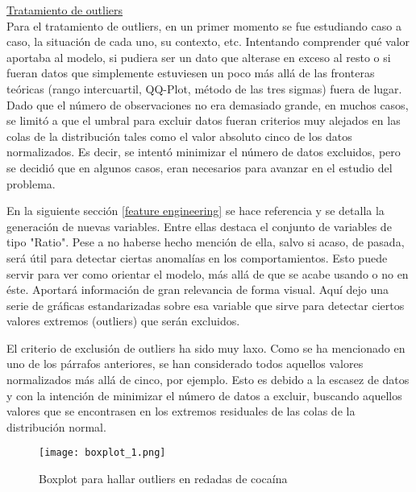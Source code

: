 \documentclass[12pt]{article}
\begin{document}
		\underline{Tratamiento de outliers}\\
		Para el tratamiento de outliers, en un primer momento se fue estudiando caso a caso, la situación de cada uno, su contexto, etc. Intentando comprender qué valor aportaba al modelo, si pudiera ser un dato que alterase en exceso al resto o si fueran datos que simplemente estuviesen un poco más allá de las fronteras teóricas (rango intercuartil, QQ-Plot, método de las tres sigmas) fuera de lugar.
		Dado que el número de observaciones no era demasiado grande, en muchos casos, se limitó a que el umbral para excluir datos fueran criterios muy alejados en las colas de la distribución tales como el valor absoluto cinco de los datos normalizados. Es decir, se intentó minimizar el número de datos excluidos, pero se decidió que en algunos casos, eran necesarios para avanzar en el estudio del problema.
		
		En la siguiente sección \ref{feature engineering} se hace referencia y se detalla la generación de nuevas variables. Entre ellas destaca el conjunto de variables de tipo "Ratio". Pese a no haberse hecho mención de ella, salvo si acaso, de pasada, será útil para detectar ciertas anomalías en los comportamientos. Esto puede servir para ver como orientar el modelo, más allá de que se acabe usando o no en éste. Aportará información de gran relevancia de forma visual. Aquí dejo una serie de gráficas estandarizadas sobre esa variable que sirve para detectar ciertos valores extremos (outliers) que serán excluidos.
		
		
		
		El criterio de exclusión de outliers ha sido muy laxo. Como se ha mencionado en uno de los párrafos anteriores, se han considerado todos aquellos valores normalizados más allá de cinco, por ejemplo. Esto es debido a la escasez de datos y con la intención de minimizar el número de datos a excluir, buscando aquellos valores que se encontrasen en los extremos residuales de las colas de la distribución normal.
		
		\begin{figure}[H]
			\caption{\label{boxplot_1} Boxplot para hallar outliers en redadas de cocaína}
			\centering
			\hspace*{1cm}
			\texttt{[image: boxplot\_1.png]}
		\end{figure}
	
\end{document}
